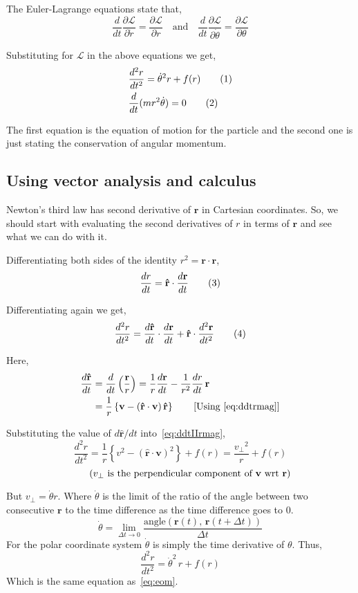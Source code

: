 \documentclass[a4paper, 12pt]{article}
\renewcommand{\indent}{\hspace{3ex}}
\newcommand\labelthis[1]{\addtocounter{equation}{1}\tag{\theequation}\label{#1}}
\renewcommand{\r}{\mathbf{r}}
\newcommand{\ru}{\mathbf{\hat{r}}}
\renewcommand{\v}{\mathbf{v}}
\newcommand{\ddt}[1]{\frac{d#1}{dt}}
\newcommand{\ddtII}[1]{\frac{d^2#1}{dt^2}}
\newcommand{\Lagr}{\mathcal{L}}
\begin{document}
The Euler-Lagrange equations state that,
\[	\ddt{} \frac{\partial \Lagr}{\partial \dot{r}} = \frac{\partial \Lagr}{\partial r} \quad\text{and}\quad
\ddt{} \frac{\partial \Lagr}{\partial \dot{\theta}} = \frac{\partial \Lagr}{\partial \theta} \]

Substituting for $\Lagr$ in the above equations we get,
\begin{align}
	&\ddtII{r} = \dot{\theta}^2 r + f(r) \labelthis{eq:eom} \\
	&\ddt{} (m r^2 \dot{\theta}) = 0 \labelthis{eq:conserv L lagrangian}
\end{align}

The first equation is the equation of motion for the particle and the second one is just stating the conservation of angular momentum.

\subsection{Using vector analysis and calculus}\label{eom vector calculus}

\indent Newton's third law has second derivative of $\r$ in Cartesian coordinates. So, we should start with evaluating the second derivatives of $r$ in terms of $\r$ and see what we can do with it.

\medskip Differentiating both sides of the identity $r^2 = \r \cdot \r$,
\[ \ddt{r} = \ru \cdot \ddt{\r} \labelthis{eq:ddtrmag} \]

Differentiating again we get,
\[ \ddtII{r} = \ddt{\ru} \cdot \ddt{\r} + \ru \cdot \ddtII{\r} \labelthis{eq:ddtIIrmag} \]

Here,
\begin{align*}
	\ddt{\ru} &= \ddt{} \left( {\frac{\r}{r}} \right) = \frac{1}{r} \ddt{\r} - \frac{1}{r^2} \ddt{r} \, \r \\
			  &= \frac{1}{r} \left\{ \v - \left( \ru \cdot \v \right) \ru \right\} \tag*{[Using~\eqref{eq:ddtrmag}]}
\end{align*}

Substituting the value of $d\ru/dt$ into~\eqref{eq:ddtIIrmag},
\[ \ddtII{r} = \frac{1}{r} \left\{ v^2 - {\left( \ru \cdot \v \right)}^2 \right\} + f(r)
																					= \frac{{v_\bot}^2}{r} + f(r) \]
\[ \tag{$v_\bot$ is the perpendicular component of $\v$ wrt $\r$} \]

But $v_\bot = \dot{\theta} r$. Where $\dot{\theta}$ is the limit of the ratio of the angle between two consecutive $\r$ to the time difference as the time difference goes to $0$.
\[ \dot{\theta} = \lim_{\Delta t \to 0} \frac{\text{angle}(\r(t), \, \r(t + \Delta t))}{\Delta t} \]
For the polar coordinate system $\dot{\theta}$ is simply the time derivative of $\theta$.  Thus,
\[ \ddtII{r} = \dot{\theta}^2 \, r + f(r) \]
Which is the same equation as~\eqref{eq:eom}.
\end{document}
